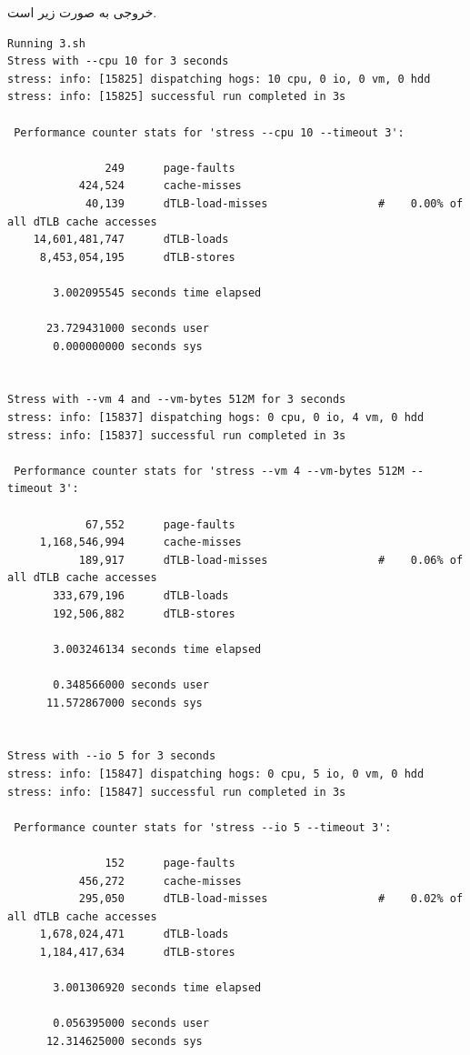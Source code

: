 \documentclass{article}
\begin{document}
خروجی به صورت زیر است. 
\begin{latin}
\begin{lstlisting}
Running 3.sh
Stress with --cpu 10 for 3 seconds
stress: info: [15825] dispatching hogs: 10 cpu, 0 io, 0 vm, 0 hdd
stress: info: [15825] successful run completed in 3s

 Performance counter stats for 'stress --cpu 10 --timeout 3':

               249      page-faults                                                           
           424,524      cache-misses                                                          
            40,139      dTLB-load-misses                 #    0.00% of all dTLB cache accesses
    14,601,481,747      dTLB-loads                                                            
     8,453,054,195      dTLB-stores                                                           

       3.002095545 seconds time elapsed

      23.729431000 seconds user
       0.000000000 seconds sys


Stress with --vm 4 and --vm-bytes 512M for 3 seconds
stress: info: [15837] dispatching hogs: 0 cpu, 0 io, 4 vm, 0 hdd
stress: info: [15837] successful run completed in 3s

 Performance counter stats for 'stress --vm 4 --vm-bytes 512M --timeout 3':

            67,552      page-faults                                                           
     1,168,546,994      cache-misses                                                          
           189,917      dTLB-load-misses                 #    0.06% of all dTLB cache accesses
       333,679,196      dTLB-loads                                                            
       192,506,882      dTLB-stores                                                           

       3.003246134 seconds time elapsed

       0.348566000 seconds user
      11.572867000 seconds sys


Stress with --io 5 for 3 seconds
stress: info: [15847] dispatching hogs: 0 cpu, 5 io, 0 vm, 0 hdd
stress: info: [15847] successful run completed in 3s

 Performance counter stats for 'stress --io 5 --timeout 3':

               152      page-faults                                                           
           456,272      cache-misses                                                          
           295,050      dTLB-load-misses                 #    0.02% of all dTLB cache accesses
     1,678,024,471      dTLB-loads                                                            
     1,184,417,634      dTLB-stores                                                           

       3.001306920 seconds time elapsed

       0.056395000 seconds user
      12.314625000 seconds sys
\end{lstlisting}
\end{latin}
\end{document}
